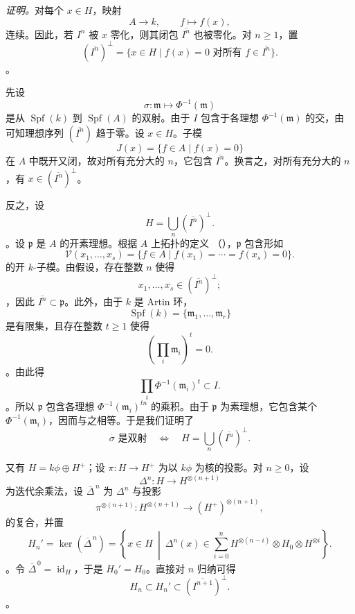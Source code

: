 \textit{证明。}对每个 \(x\in H\)，映射 \[
  A\longrightarrow k,\qquad f\longmapsto f(x),
\] 连续。因此，若 \(I^n\) 被 \(x\) 零化，则其闭包 \(\overline{I^n}\) 也被零化。对 \(n\geq1\)，置 \[
  (\overline{I^n})^\perp
  =
  \{x\in H\mid
    f(x)=0\text{ 对所有 }f\in\overline{I^n}\}.
\]。

先设 \[
  \sigma:\mathfrak m\longmapsto\Phi^{-1}(\mathfrak m)
\] 是从 \(\operatorname{Spf}(k)\) 到 \(\operatorname{Spf}(A)\) 的双射。由于 \(I\) 包含于各理想 \(\Phi^{-1}(\mathfrak m)\) 的交，由  可知理想序列 \((\overline{I^n})\) 趋于零。设 \(x\in H\)。子模 \[
  J(x)=\{f\in A\mid f(x)=0\}
\] 在 \(A\) 中既开又闭，故对所有充分大的 \(n\)，它包含 \(\overline{I^n}\)。换言之，对所有充分大的 \(n\)，有 \(x\in(\overline{I^n})^\perp\)。

反之，设 \[
  H=\bigcup_n(\overline{I^n})^\perp.
\]。设 \(\mathfrak p\) 是 \(A\) 的开素理想。根据 \(A\) 上拓扑的定义 \textup{（）}，\(\mathfrak p\) 包含形如 \[
  \mathscr V(x_1,\ldots,x_s)
  =
  \{f\in A\mid f(x_1)=\cdots=f(x_s)=0\}.
\] 的开 \(k\)-子模。由假设，存在整数 \(n\) 使得 \[
  x_1,\ldots,x_s\in(\overline{I^n})^\perp;
\]，因此 \(\overline{I^n}\subset\mathfrak p\)。此外，由于 \(k\) 是 Artin 环，\[
  \operatorname{Spf}(k)=\{\mathfrak m_1,\ldots,\mathfrak m_r\}
\] 是有限集，且存在整数 \(t\geq1\) 使得 \[
  \left(\prod_i\mathfrak m_i\right)^t=0.
\]。由此得 \[
  \prod_i\Phi^{-1}(\mathfrak m_i)^t\subset I.
\]。所以 \(\mathfrak p\) 包含各理想 \(\Phi^{-1}(\mathfrak m_i)^{tn}\) 的乘积。由于 \(\mathfrak p\) 为素理想，它包含某个 \(\Phi^{-1}(\mathfrak m_i)\)，因而与之相等。于是我们证明了 \footnotemark \begin{equation}
  \sigma\text{ 是双射}
  \quad\Longleftrightarrow\quad
  H=\bigcup_n(\overline{I^n})^\perp.
  \tag{65}
  \label{sga3:VIIB:1.3.6:eq65}
\end{equation}

又有 \(H=k\phi\oplus H^+\)；设 \(\pi:H\to H^+\) 为以 \(k\phi\) 为核的投影。对 \(n\geq0\)，设 \[
  \Delta^n:H\longrightarrow H^{\otimes(n+1)}
\] 为迭代余乘法，设 \(\overline{\Delta}^{\,n}\) 为 \(\Delta^n\) 与投影 \[
  \pi^{\otimes(n+1)}:
  H^{\otimes(n+1)}
  \longrightarrow
  (H^+)^{\otimes(n+1)},
\] 的复合，并置 \[
  H_n'
  =
  \ker(\overline{\Delta}^{\,n})
  =
  \left\{
    x\in H\ \middle|\
    \Delta^n(x)\in
    \sum_{i=0}^n
      H^{\otimes(n-i)}\otimes H_0\otimes H^{\otimes i}
  \right\}.
\]。令 \(\overline{\Delta}^{\,0}=\operatorname{id}_H\)，于是 \(H_0'=H_0\)。直接对 \(n\) 归纳可得 \begin{equation}
  H_n
  \subset
  H_n'
  \subset
  (\overline{I^{n+1}})^\perp.
  \tag{*}
  \label{sga3:VIIB:1.3.6.A:star-prime}
\end{equation}。

